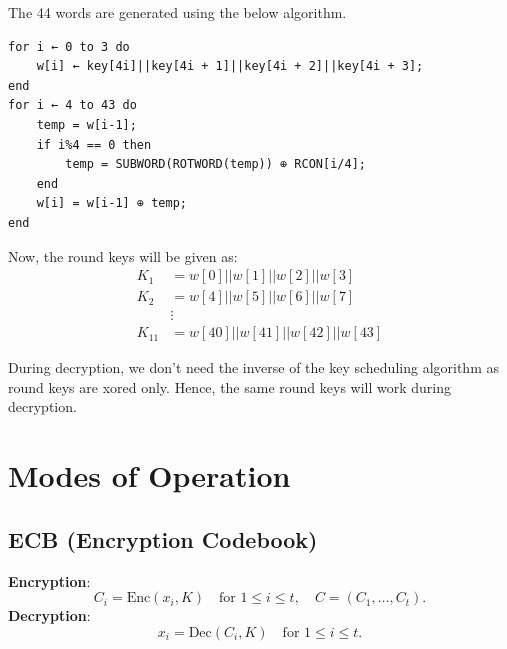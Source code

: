\documentclass[11pt]{article}
\begin{document}
The 44 words are generated using the below algorithm.
\begin{verbatim}
for i ← 0 to 3 do
    w[i] ← key[4i]||key[4i + 1]||key[4i + 2]||key[4i + 3];
end
for i ← 4 to 43 do
    temp = w[i-1];
    if i%4 == 0 then
        temp = SUBWORD(ROTWORD(temp)) ⊕ RCON[i/4];
    end
    w[i] = w[i-1] ⊕ temp;
end
\end{verbatim}

Now, the round keys will be given as:
\begin{align*}
    K_1 &= w[0]||w[1]||w[2]||w[3] \\
    K_2 &= w[4]||w[5]||w[6]||w[7] \\
    &\vdots \\
    K_{11} &= w[40]||w[41]||w[42]||w[43]
\end{align*}

During decryption, we don’t need the inverse of the key scheduling algorithm as round keys are xored only. Hence, the same round keys will work during decryption.

\section*{Modes of Operation}

\subsection*{ECB (Encryption Codebook)}
\textbf{Encryption}:
\[
C_i = \text{Enc}(x_i, K) \quad \text{for } 1 \leq i \leq t, \quad C = (C_1, \dots, C_t).
\]
\textbf{Decryption}:
\[
x_i = \text{Dec}(C_i, K) \quad \text{for } 1 \leq i \leq t.
\]
\end{document}
